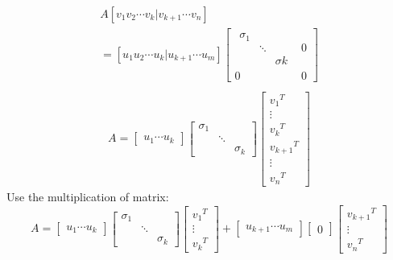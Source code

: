 \documentclass[]{article}
\begin{document}
\begin{equation}
\begin{split}
A[v_{1}v_{2}\cdots v_{k}|v_{k+1}\cdots v_{n}]\\=
[u_{1}u_{2}\cdots u_{k}|u_{k+1}\cdots u_{m}]
\left[ \begin{matrix}
   \begin{matrix}
   \sigma_{1}&&\\
   &\ddots&\\
   &&\sigma{k}
   \end{matrix}&0\\
   0&0  
\end{matrix}\right]\\
\end{split}
\end{equation}
\begin{equation}
\begin{split}
A=\left[ \begin{matrix}
u_{1} \cdots u_{k}
\end{matrix}\right]\left[ \begin{matrix}
\sigma_{1}&&\\
&\ddots&\\
&&\sigma_{k}
\end{matrix}\right]\left[\begin{matrix}
 { v_{1}}^{T}\\
 \vdots\\
 {v_{k}}^{T}\\
 {v_{k+1}}^{T}\\
 \vdots\\
 {v_{n}}^{T}
\end{matrix}\right]
\end{split}
\end{equation}
Use the multiplication of matrix:
\begin{equation}
   A=\left[\begin{matrix}
     u_{1} \cdots u_{k}
   \end{matrix}\right]
   \left[ \begin{matrix}
     \sigma_{1}&&\\
     &\ddots&\\
     &&\sigma_{k}
   \end{matrix}\right]
   \left[
   \begin{matrix}
   {v_{1}}^{T}\\
   \vdots\\
   {v_{k}}^{T}
   \end{matrix}\right]+
   \left[\begin{matrix}
   u_{k+1} \cdots u_{m}
   \end{matrix}\right]
   \left[ \begin{matrix}
   0
   \end{matrix}\right]
   \left[
   \begin{matrix}
   {v_{k+1}}^{T}\\
   \vdots\\
   {v_{n}}^{T}
   \end{matrix}\right]   
\end{equation}
\end{document}
